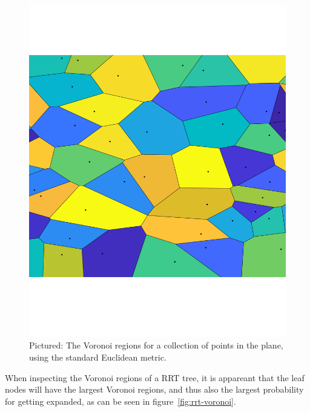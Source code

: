\begin{figure}
  \label{fig:voronoi-diagram}
  \includegraphics[scale=.3]{figures/rrt/voronoi-diagram}
  \caption{Pictured: The Voronoi regions for a collection of points in the plane,
    using the standard Euclidean metric.}
\end{figure}

When inspecting the Voronoi regions of a \ac{RRT} tree, it is appareant that the
leaf nodes will have the largest Voronoi regions, and thus also the largest
probability for getting expanded, as can be seen in figure~\ref{fig:rrt-voronoi}.

